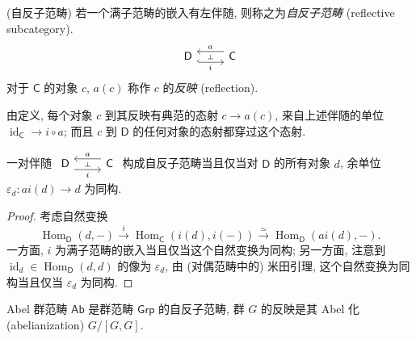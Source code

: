 \begin{definition}
	[label={reflective-subcategory}]
	{(自反子范畴)}
	若一个满子范畴的嵌入有左伴随, 则称之为\emph{自反子范畴} (reflective subcategory).
	\[\begin{tikzcd}[ampersand replacement=\&]
		{\mathsf D} \& {\mathsf C}
		\arrow[""{name=0, anchor=center, inner sep=0}, "i"', shift right=2, hook, from=1-1, to=1-2]
		\arrow[""{name=1, anchor=center, inner sep=0}, "a"', shift right=2, from=1-2, to=1-1]
		\arrow["\dashv"{anchor=center, rotate=-90}, draw=none, from=1, to=0]
	\end{tikzcd}\]
	对于 $\mathsf C$ 的对象 $c$, $a(c)$ 称作 $c$ 的\emph{反映} (reflection).
\end{definition}

由定义, 每个对象 $c$ 到其反映有典范的态射 $c \to a(c)$, 来自上述伴随的单位 $\operatorname{id}_{\mathsf C}\to i\circ a$;
而且 $c$ 到 $\mathsf D$ 的任何对象的态射都穿过这个态射.

\begin{prop}
	{}
	一对伴随 $\adj{a}{i}{\mathsf {D}}{\mathsf {C}}$%
	构成自反子范畴当且仅当对 $\mathsf D$ 的所有对象 $d$, 余单位 $\varepsilon_d\colon ai(d)\to d$ 为同构.
\end{prop}
\begin{proof}
	考虑自然变换
	\[
	\operatorname{Hom}_{\mathsf D}(d,-)\overset{i}{\to}\operatorname{Hom}_{\mathsf C}(i(d),i(-))
	\overset{\simeq}{\to} \operatorname{Hom}_{\mathsf D}(ai(d),-).
	\]
	一方面, $i$ 为满子范畴的嵌入当且仅当这个自然变换为同构;
	另一方面, 注意到
	$\operatorname{id}_d\in\operatorname{Hom}_{\mathsf D}(d,d)$ 的像为 $\varepsilon_d$,
	由 (对偶范畴中的) 米田引理, 这个自然变换为同构当且仅当 $\varepsilon_d$ 为同构.
\end{proof}


\begin{example}
	{}
	Abel 群范畴 $\mathsf {Ab}$ 是群范畴 $\mathsf {Grp}$ 的自反子范畴, 群 $G$ 的反映是其 Abel 化 (abelianization) $G/[G,G]$.
\end{example}

